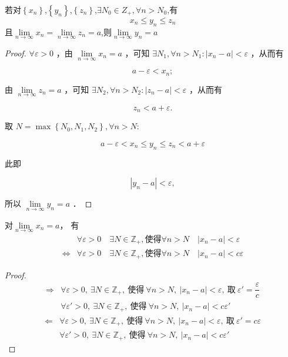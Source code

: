 \begin{theorem}
	若对$\left\{x_n\right\}$,$\left\{y_n\right\}$,$\left\{z_n\right\}$,$\exists N_0 \in Z_{+},\forall n >N_0 $,有
	$$
	x_n \leqslant y_n \leqslant z_n
	$$
	且$\lim\limits_{n \rightarrow \infty} x_n=\lim\limits_{n \rightarrow \infty}z_n=a$,则$\lim\limits_{n \rightarrow \infty}y_n=a$
\end{theorem}
\begin{proof}
	$\forall \varepsilon>0$ ，由 $\lim\limits_{n \rightarrow \infty} x_n=a$ ，可知 $\exists N_1, \forall n>N_1:\left|x_n-a\right|<\varepsilon$ ，从而有
	
	$$
	a-\varepsilon<x_n ;
	$$
	
	
	由 $\lim\limits_{n \rightarrow \infty} z_n=a$ ，可知 $\exists N_2, \forall n>N_2:\left|z_n-a\right|<\varepsilon$ ，从而有
	
	$$
	z_n<a+\varepsilon .
	$$
	
	
	取 $N=\max \left\{N_0, N_1, N_2\right\}, \forall n>N:$
	
	$$
	a-\varepsilon<x_n \leqslant y_n \leqslant z_n<a+\varepsilon
	$$
	
	
	此即
	
	$$
	\left|y_n-a\right|<\varepsilon,
	$$
	
	
	所以 $\lim\limits_{n \rightarrow \infty} y_n=a$ ．
\end{proof}
\begin{lemma}
	对$\lim\limits_{n\rightarrow\infty} x_n=a$，
	有 
	\begin{align*}
		&\forall \varepsilon>0 \quad \exists N \in \mathbb{Z}_{+} , \text{使得}\forall n>N \quad\left|x_n-a\right|<\varepsilon\\
		\Leftrightarrow & \forall \varepsilon>0 \quad \exists N \in \mathbb{Z}_{+} ,\text{使得} \forall n>N \quad\left|x_n-a\right|<c \varepsilon
	\end{align*}
	
\end{lemma}
\begin{proof}
	\begin{align*}
		\Rightarrow &\forall\varepsilon>0,\ \exists N\in \mathbb{Z}_{+},\ \text{使得}\ \forall n>N,\ |x_n-a|<\varepsilon,\ \text{取}\ \varepsilon'=\dfrac{\varepsilon}{c}\\
		&\forall\varepsilon'>0,\ \exists N\in \mathbb{Z}_{+},\ \text{使得}\ \forall n>N,\ |x_n-a|<c\varepsilon'
	\end{align*}
	\begin{align*}
		\Leftarrow &\forall\varepsilon>0,\ \exists N\in \mathbb{Z}_{+},\ \text{使得}\ \forall n>N,\ |x_n-a|<\varepsilon,\ \text{取}\ \varepsilon'=c\varepsilon\\
		&\forall\varepsilon'>0,\ \exists N\in \mathbb{Z}_{+},\ \text{使得}\ \forall n>N,\ |x_n-a|<c\varepsilon'
	\end{align*}
	
	
\end{proof}
